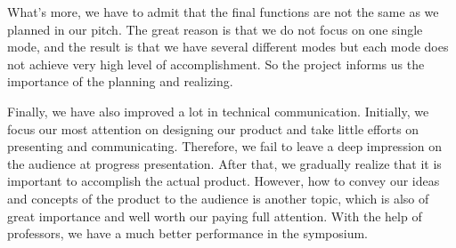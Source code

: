 What’s more, we have to admit that the final functions are not the same as we
planned in our pitch. The great reason is that we do not focus on one single
mode, and the result is that we have several different modes but each mode does
not achieve very high level of accomplishment. So the project informs us the
importance of the planning and realizing. 

Finally, we have also improved a lot in technical communication. Initially, we
focus our most attention on designing our product and take little efforts on
presenting and communicating. Therefore, we fail to leave a deep impression on
the audience at progress presentation. After that, we gradually realize that it
is important to accomplish the actual product. However, how to convey our ideas
and concepts of the product to the audience is another topic, which is also of
great importance and well worth our paying full attention. With the help of
professors, we have a much better performance in the symposium. 